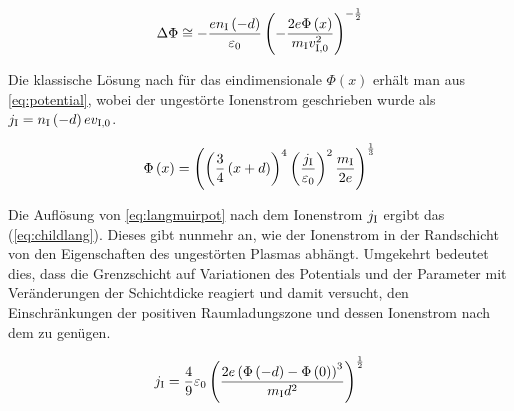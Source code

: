     \begin{align}
      \Delta\Phi\cong-\frac{en_\text{I}\left(-d\right)}{\varepsilon_\text{0}}\left(-\frac{2e\Phi\left(x\right)}{m_\text{I}v_\text{I,0}^2}\right)^{-\frac{1}{2}} \label{eq:potential}
    \end{align}

  Die klassische Lösung nach  für das eindimensionale $\Phi\left(x\right)$ erhält man aus \autoref{eq:potential}, wobei der ungestörte Ionenstrom geschrieben wurde als $j_\text{I}=n_\text{I}\left(-d\right)ev_\text{I,0}$.

    \begin{align}
      \Phi\left(x\right)=\left(\left(\frac{3}{4}\left(x+d\right)\right)^4\left(\frac{j_\text{I}}{\varepsilon_\text{0}}\right)^2\frac{m_\text{I}}{2e}\right)^{\frac{1}{3}}  \label{eq:langmuirpot}
    \end{align}

  Die Auflösung von \autoref{eq:langmuirpot} nach dem Ionenstrom $j_\text{I}$ ergibt das  (\autoref{eq:childlang}). Dieses gibt nunmehr an, wie der Ionenstrom in der Randschicht von den Eigenschaften des ungestörten Plasmas abhängt. Umgekehrt bedeutet dies, dass die Grenzschicht auf Variationen des Potentials und der Parameter mit Veränderungen der Schichtdicke reagiert und damit versucht, den Einschränkungen der positiven Raumladungszone und dessen Ionenstrom nach dem  zu genügen.

    \begin{align}
      j_\text{I}=\frac{4}{9}\varepsilon_\text{0}\left(\frac{2e\left(\Phi\left(-d\right)-\Phi\left(0\right)\right)^3}{m_\text{I}d^2}\right)^{\frac{1}{2}} \label{eq:childlang}
    \end{align}

